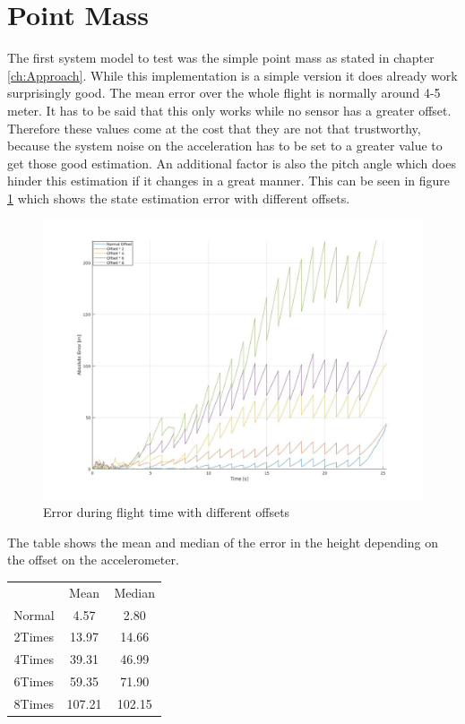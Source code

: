 \section{Point Mass}
The first system model to test was the simple point mass as stated in chapter \ref{ch:Approach}.
While this implementation is a simple version it does already work surprisingly good.
The mean error over the whole flight is normally around 4-5 meter.
It has to be said that this only works while no sensor has a greater offset.
Therefore these values come at the cost that they are not that trustworthy, 
because the system noise on the acceleration has to be set to a greater value to get those good estimation.
An additional factor is also the pitch angle which does hinder this estimation if it changes in a great manner.
This can be seen in figure \ref{fig:PointMassErrorWithOffset} which shows the state estimation error with different offsets.

\begin{figure}[h!]
 \centering
 \includegraphics[width=.8\textwidth]{./Pictures/PointMassErrorWithOffset.jpg}
 \caption{Error during flight time with different offsets}
 \label{fig:PointMassErrorWithOffset}
\end{figure}


The table %
shows the mean and median of the error in the height depending on the offset on the accelerometer.
\begin{center}
\begin{tabular}{ccc}
& Mean & Median\\
Normal & 4.57 & 2.80\\
2Times & 13.97 & 14.66\\
4Times & 39.31 & 46.99\\
6Times & 59.35 & 71.90\\
8Times & 107.21 & 102.15
\end{tabular}
\end{center}

